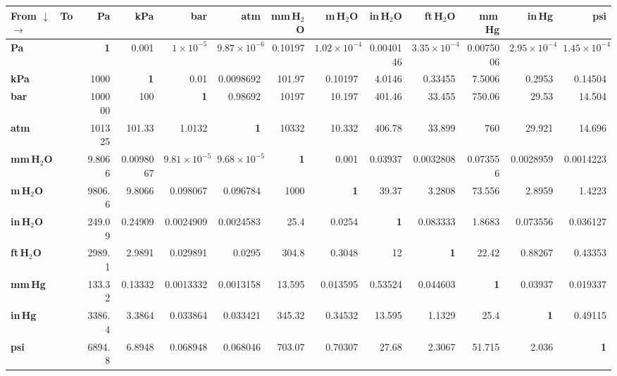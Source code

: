 \documentclass[9pt]{extarticle}
\renewcommand{\arraystretch}{1.1}
\begin{document}
{\convfont\setlength{\tabcolsep}{2.6pt}\renewcommand{\arraystretch}{1.25}
\noindent\begin{tabular}{@{}lrrrrrrrrrrr@{}}\toprule
\rowcolor{hdr}\textbf{From $\downarrow$ \ To $\rightarrow$} & \textbf{Pa} & \textbf{kPa} & \textbf{bar} & \textbf{atm} & \textbf{mm\,H$_2$O} & \textbf{m\,H$_2$O} & \textbf{in\,H$_2$O} & \textbf{ft\,H$_2$O} & \textbf{mm\,Hg} & \textbf{in\,Hg} & \textbf{psi}\\ \midrule
\cellcolor{hdr}\textbf{Pa} & \textbf{1} & 0.001 & $1\times10^{-5}$ & $9.87\times10^{-6}$ & 0.10197 & $1.02\times10^{-4}$ & 0.0040146 & $3.35\times10^{-4}$ & 0.0075006 & $2.95\times10^{-4}$ & $1.45\times10^{-4}$\\
\rowcolor{zebra}\cellcolor{hdr}\textbf{kPa} & 1000 & \textbf{1} & 0.01 & 0.0098692 & 101.97 & 0.10197 & 4.0146 & 0.33455 & 7.5006 & 0.2953 & 0.14504\\
\cellcolor{hdr}\textbf{bar} & 100000 & 100 & \textbf{1} & 0.98692 & 10197 & 10.197 & 401.46 & 33.455 & 750.06 & 29.53 & 14.504\\
\rowcolor{zebra}\cellcolor{hdr}\textbf{atm} & 101325 & 101.33 & 1.0132 & \textbf{1} & 10332 & 10.332 & 406.78 & 33.899 & 760 & 29.921 & 14.696\\
\cellcolor{hdr}\textbf{mm\,H$_2$O} & 9.8066 & 0.0098067 & $9.81\times10^{-5}$ & $9.68\times10^{-5}$ & \textbf{1} & 0.001 & 0.03937 & 0.0032808 & 0.073556 & 0.0028959 & 0.0014223\\
\rowcolor{zebra}\cellcolor{hdr}\textbf{m\,H$_2$O} & 9806.6 & 9.8066 & 0.098067 & 0.096784 & 1000 & \textbf{1} & 39.37 & 3.2808 & 73.556 & 2.8959 & 1.4223\\
\cellcolor{hdr}\textbf{in\,H$_2$O} & 249.09 & 0.24909 & 0.0024909 & 0.0024583 & 25.4 & 0.0254 & \textbf{1} & 0.083333 & 1.8683 & 0.073556 & 0.036127\\
\rowcolor{zebra}\cellcolor{hdr}\textbf{ft\,H$_2$O} & 2989.1 & 2.9891 & 0.029891 & 0.0295 & 304.8 & 0.3048 & 12 & \textbf{1} & 22.42 & 0.88267 & 0.43353\\
\cellcolor{hdr}\textbf{mm\,Hg} & 133.32 & 0.13332 & 0.0013332 & 0.0013158 & 13.595 & 0.013595 & 0.53524 & 0.044603 & \textbf{1} & 0.03937 & 0.019337\\
\rowcolor{zebra}\cellcolor{hdr}\textbf{in\,Hg} & 3386.4 & 3.3864 & 0.033864 & 0.033421 & 345.32 & 0.34532 & 13.595 & 1.1329 & 25.4 & \textbf{1} & 0.49115\\
\cellcolor{hdr}\textbf{psi} & 6894.8 & 6.8948 & 0.068948 & 0.068046 & 703.07 & 0.70307 & 27.68 & 2.3067 & 51.715 & 2.036 & \textbf{1}\\
\bottomrule\end{tabular}}
\end{document}
